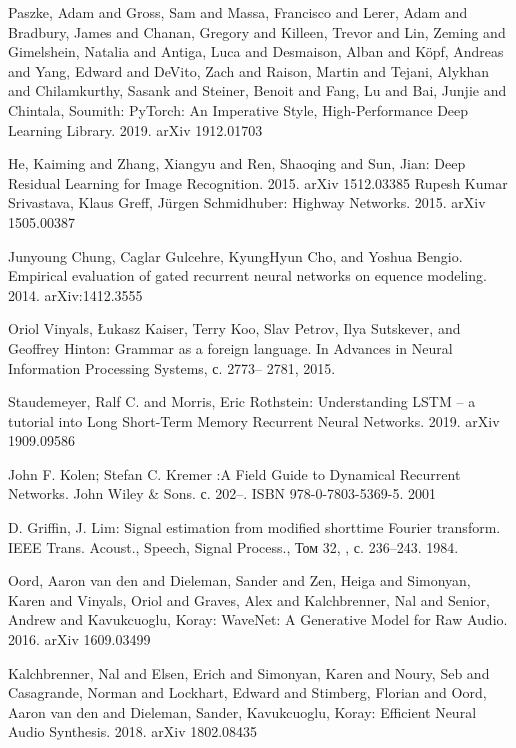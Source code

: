 \documentclass[oneside,final,14pt]{extreport}
\begin{document}
\begin{thebibliography}{0}
 Paszke, Adam and Gross, Sam and Massa, Francisco and Lerer, Adam and Bradbury, James and Chanan, Gregory and Killeen, Trevor and Lin, Zeming and Gimelshein, Natalia and Antiga, Luca and Desmaison, Alban and Köpf, Andreas and Yang, Edward and DeVito, Zach and Raison, Martin and Tejani, Alykhan and Chilamkurthy, Sasank and Steiner, Benoit and Fang, Lu and Bai, Junjie and Chintala, Soumith: PyTorch: An Imperative Style, High-Performance Deep Learning Library. 2019. arXiv 1912.01703

 He, Kaiming and Zhang, Xiangyu and Ren, Shaoqing and Sun, Jian: Deep Residual Learning for Image Recognition. 2015. arXiv 1512.03385
 Rupesh Kumar Srivastava, Klaus Greff, Jürgen Schmidhuber: Highway Networks. 2015. arXiv 1505.00387

 Junyoung Chung, Caglar Gulcehre, KyungHyun Cho, and Yoshua Bengio. Empirical evaluation of gated recurrent neural networks on equence modeling. 2014. arXiv:1412.3555

 Oriol Vinyals, Łukasz Kaiser, Terry Koo, Slav Petrov, Ilya Sutskever, and Geoffrey Hinton: Grammar as a foreign language. In Advances in Neural Information Processing Systems, с. 2773–
2781, 2015.

 Staudemeyer, Ralf C. and Morris, Eric Rothstein: Understanding LSTM -- a tutorial into Long Short-Term Memory Recurrent Neural Networks. 2019. arXiv 1909.09586

 John F. Kolen; Stefan C. Kremer :A Field Guide to Dynamical Recurrent Networks. John Wiley & Sons. с. 202–. ISBN 978-0-7803-5369-5. 2001

 D. Griffin, J. Lim: Signal estimation from modified shorttime Fourier transform. IEEE Trans. Acoust., Speech, Signal Process., Том 32, , с. 236–243. 1984.

 Oord, Aaron van den and Dieleman, Sander and Zen, Heiga and Simonyan, Karen and Vinyals, Oriol and Graves, Alex and Kalchbrenner, Nal and Senior, Andrew and Kavukcuoglu, Koray: WaveNet: A Generative Model for Raw Audio. 2016. arXiv 1609.03499

 Kalchbrenner, Nal and Elsen, Erich and Simonyan, Karen and Noury, Seb and Casagrande, Norman and Lockhart, Edward and Stimberg, Florian and Oord, Aaron van den and Dieleman, Sander, Kavukcuoglu, Koray: Efficient Neural Audio Synthesis. 2018. arXiv 1802.08435


\end{thebibliography}
\end{document}
